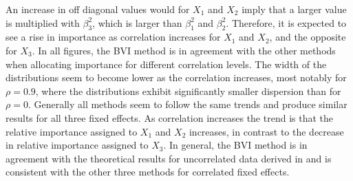 An increase in off diagonal values would for $X_1$ and $X_2$ imply that a larger value is multiplied with $\beta_3^2$, which is larger than $\beta_1^2$ and $\beta_2^2$. 
Therefore, it is expected to see a rise in importance as correlation increases for $X_1$ and $X_2$, and the opposite for $X_3$.
In all figures, the BVI method is in agreement with the other methods when allocating importance for different correlation levels.
The width of the distributions seem to become lower as the correlation increases, most notably for $\rho=0.9$, where the distributions exhibit significantly smaller dispersion than for $\rho=0$.
Generally all methods seem to follow the same trends and produce similar results for all three fixed effects. 
As correlation increases the trend is that the relative importance assigned to $X_1$ and $X_2$ increases, in contrast to the decrease in relative importance assigned to $X_3$.
\newline
\newline
In general, the BVI method is in agreement with the theoretical results for uncorrelated data derived in  and is consistent with the other three methods for correlated fixed effects. 
